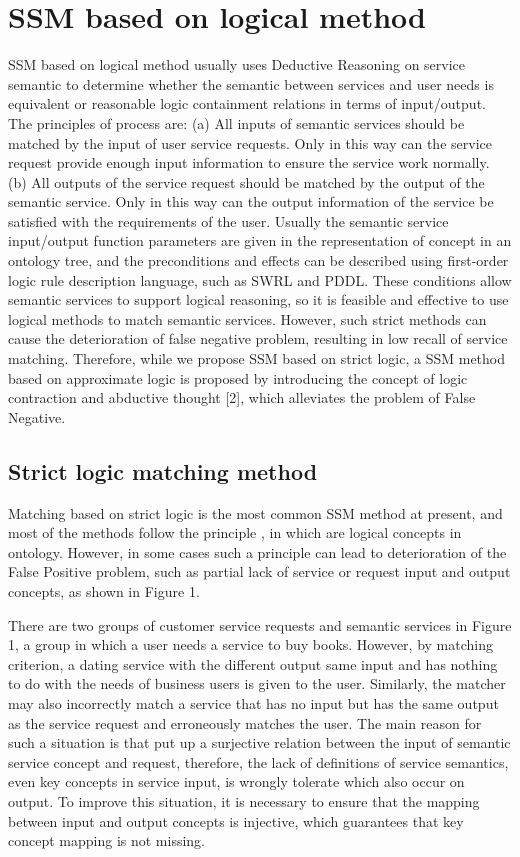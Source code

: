 \documentclass{ieeeaccess}
\begin{document}
\section{SSM based on logical method}
SSM based on logical method usually uses Deductive Reasoning on service semantic to determine whether the semantic between services and user needs is equivalent or reasonable logic containment relations in terms of input/output. The principles of process are: (a) All inputs of semantic services should be matched by the input of user service requests. Only in this way can the service request provide enough input information to ensure the service work normally. (b) All outputs of the service request should be matched by the output of the semantic service. Only in this way can the output information of the service be satisfied with the requirements of the user. Usually the semantic service input/output function parameters are given in the representation of concept in an ontology tree, and the preconditions and effects can be described using first-order logic rule description language, such as SWRL and PDDL. These conditions allow semantic services to support logical reasoning, so it is feasible and effective to use logical methods to match semantic services. However, such strict methods can cause the deterioration of false negative problem, resulting in low recall of service matching. Therefore, while we propose SSM based on strict logic, a SSM method based on approximate logic is proposed by introducing the concept of logic contraction and abductive thought [2], which alleviates the problem of False Negative.

\subsection{Strict logic matching method}
Matching based on strict logic is the most common SSM method at present, and most of the methods follow the principle  , in which  are logical concepts in ontology. However, in some cases such a principle can lead to deterioration of the False Positive problem, such as partial lack of service or request input and output concepts, as shown in Figure 1.

There are two groups of customer service requests and semantic services in Figure 1, a group in which a user needs a service to buy books. However, by matching criterion, a dating service with the different output same input and has nothing to do with the needs of business users is given to the user. Similarly, the matcher may also incorrectly match a service that has no input but has the same output as the service request and erroneously matches the user. The main reason for such a situation is that   put up a surjective relation between the input of semantic service concept and request, therefore, the lack of definitions of service semantics, even key concepts in service input, is wrongly tolerate which also occur on output. To improve this situation, it is necessary to ensure that the mapping between input and output concepts is injective, which guarantees that key concept mapping is not missing.
\end{document}
